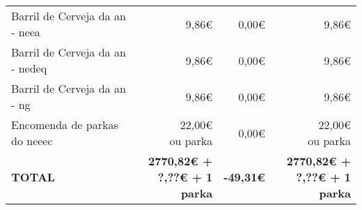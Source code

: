 \begin{longtable}{Xrrr}
Barril de Cerveja da \acrshort{an} - \acrshort{neea} & 9,86€ & 0,00€ & 9,86€ \\

Barril de Cerveja da \acrshort{an} - \acrshort{nedeq} & 9,86€ & 0,00€ & 9,86€ \\

Barril de Cerveja da \acrshort{an} - \acrshort{ng} & 9,86€ & 0,00€ & 9,86€ \\

Encomenda de parkas do \acrshort{neeec} & \shortstack{22,00€\\ou parka} & 0,00€ & \shortstack{22,00€\\ou parka} \\

\midrule \midrule
\bfseries TOTAL & \bfseries \shortstack{2770,82€ + \\?,??€ + 1 parka} & \bfseries -49,31€ & \bfseries \shortstack{2770,82€ + \\?,??€ + 1 parka} \\

\end{longtable}